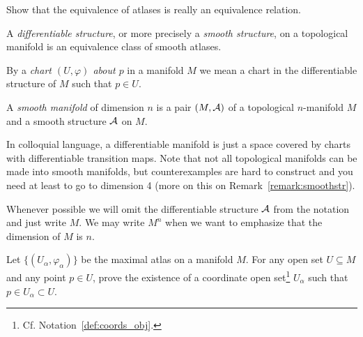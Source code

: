 \begin{exercise}
  Show that the equivalence of atlases is really an equivalence relation.
\end{exercise}

\begin{definition}\label{def:diffstr}
  A \emph{differentiable structure}, or more precisely a \emph{smooth structure}, on a topological manifold is an equivalence class of smooth atlases.
\end{definition}

\begin{notation}
  By a \emph{chart $(U, \varphi)$ about $p$} in a manifold $M$ we mean a chart in the differentiable structure of $M$ such that $p\in U$.
\end{notation}

\begin{definition}\label{def:diffmanifold}
  A \emph{smooth manifold} of dimension $n$ is a pair $(M, \mathcal{A})$ of a topological $n$-manifold $M$ and a smooth structure $\mathcal{A}$ on $M$.
\end{definition}

In colloquial language, a differentiable manifold is just a space covered by charts with differentiable transition maps.
Note that not all topological manifolds can be made into smooth manifolds, but counterexamples are hard to construct and you need at least to go to dimension 4 (more on this on Remark~\ref{remark:smoothstr}).

\begin{notation}
  Whenever possible we will omit the differentiable structure $\mathcal{A}$ from the notation and just write $M$.
  We may write $M^n$ when we want to emphasize that the dimension of $M$ is $n$.
\end{notation}

\begin{exercise}
	Let $\{(U_\alpha, \varphi_\alpha)\}$ be the maximal atlas on a manifold $M$.
  For any open set $U\subseteq M$ and any point $p\in U$, prove the existence of a coordinate open set\footnote{Cf. Notation~\ref{def:coords_obj}.} $U_\alpha$ such that $p\in U_\alpha\subset U$.
\end{exercise}

